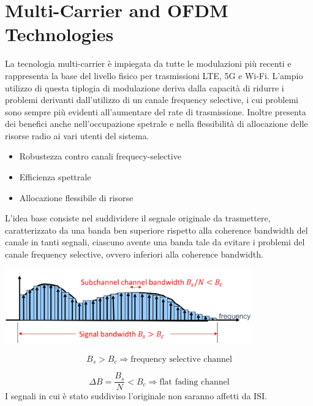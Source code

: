 \section*{Multi-Carrier and OFDM Technologies}






La tecnologia multi-carrier è impiegata da tutte le modulazioni più recenti e rappresenta la base del livello fisico per trasmissioni LTE, 5G e Wi-Fi. 
L'ampio utilizzo di questa tiplogia di modulazione deriva dalla capacità di ridurre i problemi derivanti dall'utilizzo di un canale frequency selective, i cui problemi sono sempre più evidenti all'aumentare del rate di trasmissione. Inoltre presenta dei benefici anche nell'occupazione spetrale e nella flessibilità di allocazione delle risorse radio ai vari utenti del sistema.
\begin{itemize}
    \item Robustezza contro canali frequecy-selective
    \item Efficienza spettrale
    \item Allocazione flessibile di risorse
\end{itemize}

L'idea base consiste nel suddividere il segnale originale da trasmettere, caratterizzato da una banda ben superiore rispetto alla coherence bandwidth del canale in tanti segnali,
ciascuno avente una banda tale da evitare i problemi del canale frequency selective, ovvero inferiori alla coherence bandwidth.





\begin{center}
    \includegraphics[width=0.8\textwidth]{imgs/multicarrier.jpg}
\end{center}
 



\[
  B_s > B_c \Rightarrow \text{frequency selective channel}  
\]

\[
    \Delta B = \frac{B_s}{N} < B_c \Rightarrow \text{flat fading channel}
\]
I segnali in cui è stato suddiviso l'originale non saranno affetti da ISI.

